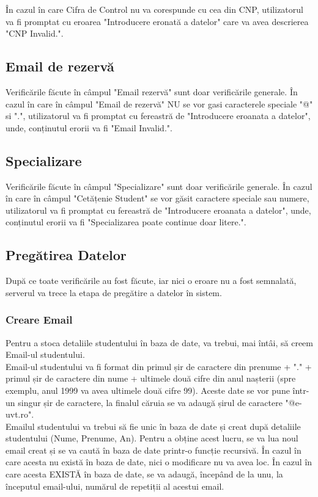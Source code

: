 \documentclass{article}
\begin{document}
	În cazul în care Cifra de Control nu va corespunde cu cea din CNP, utilizatorul va fi promptat cu eroarea "Introducere eronată a datelor" care va avea descrierea "CNP Invalid.".
		\subsection*{Email de rezervă}

	Verificările făcute în câmpul "Email rezervă" sunt doar verificările generale. În cazul în care în câmpul "Email de rezervă" NU se vor gasi caracterele speciale "@" si ".", utilizatorul va fi promptat cu fereastră de "Introducere eroanata a datelor", unde, conținutul erorii va fi "Email Invalid.".

		\subsection*{Specializare}

		Verificările făcute în câmpul "Specializare" sunt doar verificările generale. În cazul în care în câmpul "Cetățenie Student" se vor găsit caractere speciale sau numere, utilizatorul va fi promptat cu fereastră de "Introducere eroanata a datelor", unde, conținutul erorii va fi "Specializarea poate continue doar litere.". 

		\subsection*{Pregătirea Datelor}
		După ce toate verificările au fost făcute, iar nici o eroare nu a fost semnalată, serverul va trece la etapa de pregătire a datelor în sistem.\\

		\subsubsection*{Creare Email}
		Pentru a stoca detaliile studentului în baza de date, va trebui, mai întâi, să creem Email-ul studentului.\\
		Email-ul studentului va fi format din primul șir de caractere din prenume + "." + primul șir de caractere din nume + ultimele două cifre din anul nașterii (spre exemplu, anul 1999 va avea ultimele două cifre 99). Aceste date se vor pune într-un singur șir de caractere, la finalul căruia se va adaugă șirul de caractere "@e-uvt.ro". \\
		
		Emailul studentului va trebui să fie unic în baza de date și creat după detaliile studentului (Nume, Prenume, An). Pentru a obține acest lucru, se va lua noul email creat și se va caută în baza de date printr-o funcție recursivă. În cazul în care acesta nu există în baza de date, nici o modificare nu va avea loc. În cazul în care acesta EXISTĂ în baza de date, se va adaugă, începând de la unu, la începutul email-ului, numărul de repetiții al acestui email.
\end{document}
